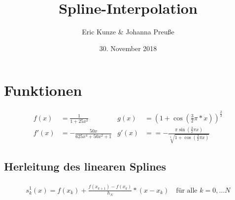 \documentclass[a4paper, 11pt, ngerman]{scrartcl}
\title{Spline-Interpolation}
\author{Eric Kunze \& Johanna Preuße}
\date{30. November 2018}
\begin{document}
	

\section{Funktionen}

\begin{align*}
	f(x) &= \frac{1}{1+25x^2} & g(x) &= \left(1+\cos\left( \frac{3}{2}\pi*x\right)\right)^{\frac{2}{3}} \\
	f'(x) &= - \frac{50x}{625x^4+50x^2+1} & g'(x) &= =-\frac{\pi\sin\left(\frac{3}{2}\pi x\right)}{\sqrt[3]{1+\cos\left(\frac{3}{2}\pi x \right)}}
\end{align*}

\subsection{Herleitung des linearen Splines}
\begin{align*}
	s_k^1(x) = f(x_k) + \frac{f(x_{k+1})- f(x_k)}{h_N} * (x - x_k) \quad \text{für alle } k = 0, \dots N
\end{align*}
\end{document}
